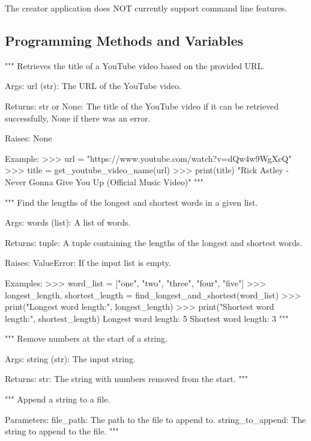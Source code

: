 The creator application does NOT currently support command line features.

\subsection{Programming Methods and Variables}

\begin{codebox}
"""
Retrieves the title of a YouTube video based on the provided URL.

Args:
    url (str): The URL of the YouTube video.

Returns:
    str or None: The title of the YouTube video if it can be retrieved successfully,
                 None if there was an error.

Raises:
    None

Example:
    >>> url = "https://www.youtube.com/watch?v=dQw4w9WgXcQ"
    >>> title = get_youtube_video_name(url)
    >>> print(title)
    "Rick Astley - Never Gonna Give You Up (Official Music Video)"
"""
\end{codebox}

\begin{codebox}
"""
Find the lengths of the longest and shortest words in a given list.

Args:
    words (list): A list of words.

Returns:
    tuple: A tuple containing the lengths of the longest and shortest words.

Raises:
    ValueError: If the input list is empty.

Examples:
    >>> word_list = ["one", "two", "three", "four", "five"]
    >>> longest_length, shortest_length = find_longest_and_shortest(word_list)
    >>> print("Longest word length:", longest_length)
    >>> print("Shortest word length:", shortest_length)
    Longest word length: 5
    Shortest word length: 3
"""
\end{codebox}

\begin{codebox}
"""
Remove numbers at the start of a string.

Args:
    string (str): The input string.

Returns:
    str: The string with numbers removed from the start.
"""
\end{codebox}

\begin{codebox}
"""
Append a string to a file.

Parameters:
    file_path: The path to the file to append to.
    string_to_append: The string to append to the file.
"""
\end{codebox}

